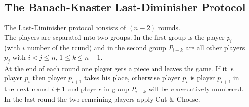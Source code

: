 \subsection{The Banach-Knaster Last-Diminisher Protocol}
The Last-Diminisher protocol consists of $(n-2)$ rounds.\\The players are separated into two groups. In the first group is the player $p_i$ (with $i$ number of the round) and in the second group $P_{i+k}$ are all other players $p_j$ with $i <j\leq n$, $1\leq k \leq n-1$.\\ At the end of each round one player gets a piece and leaves the game. If it is player $p_i$ then player $p_{i+1}$ takes his place, otherwise player $p_i$ is player $p_{i+1}$ in the next round $i+1$ and players in group $P_{i+k}$ will be consecutively numbered. In the last round the two remaining players apply Cut $\&$ Choose. 

